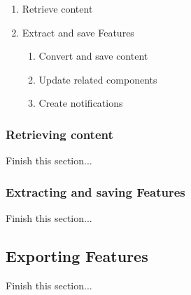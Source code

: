  \begin{enumerate}
   \item Retrieve content
   \item Extract and save Features
   \begin{enumerate}
     \item Convert and save content
     \item Update related components
     \item Create notifications
   \end{enumerate}
 \end{enumerate}
 
 \subsubsection{Retrieving content}
 
 Finish this section...
 
 \subsubsection{Extracting and saving Features}
 Finish this section...

\subsection{Exporting Features}
Finish this section...


